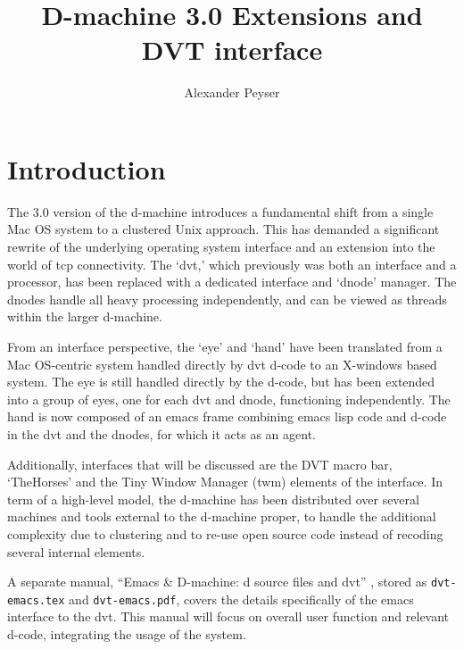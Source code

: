 \documentclass[12pt]{article}
\title{
  \vspace*{-2\baselineskip}
  D-machine 3.0 Extensions and DVT interface
}
\author{Alexander Peyser}
\begin{document}
\maketitle\vspace{-4\baselineskip}
\tableofcontents{}
\newpage

\setlength{\parindent}{0pt}
\setlength{\parskip}{6pt}

\section{Introduction}
\label{sec:intro}

The 3.0 version of the d-machine introduces a fundamental shift from a
single Mac OS system to a clustered Unix approach.  This has demanded
a significant rewrite of the underlying operating system interface and
an extension into the world of tcp connectivity. The `dvt,' which
previously was both an interface and a processor, has been replaced
with a dedicated interface and `dnode' manager.  The dnodes handle all
heavy processing independently, and can be viewed as threads within
the larger d-machine.

From an interface perspective, the `eye' and `hand' have been
translated from a Mac OS-centric system handled directly by dvt d-code
to an X-windows based system.  The eye is still handled directly by
the d-code, but has been extended into a group of eyes, one for each
dvt and dnode, functioning independently.  The hand is now composed of
an emacs frame combining emacs lisp code and d-code in the dvt and the
dnodes, for which it acts as an agent.

Additionally, interfaces that will be discussed are the DVT macro bar,
`TheHorses' and the Tiny Window Manager (twm) elements of the
interface. In term of a high-level model, the d-machine has been
distributed over several machines and tools external to the d-machine
proper, to handle the additional complexity due to clustering and to
re-use open source code instead of recoding several internal elements.

A separate manual, ``Emacs \& D-machine: d source files and dvt''
\citep{dvt-emacs}, stored as \verb$dvt-emacs.tex$ and
\verb$dvt-emacs.pdf$, covers the details specifically of the emacs
interface to the dvt.  This manual will focus on overall user function
and relevant d-code, integrating the usage of the system.
\end{document}
